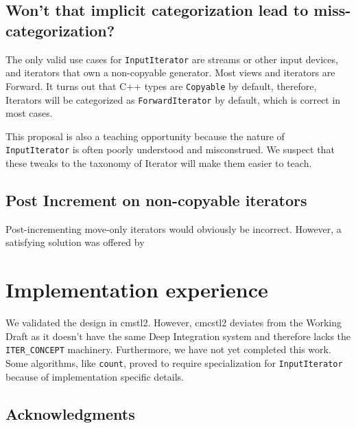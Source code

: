 \documentclass{wg21}
\begin{document}
\hypertarget{wont-that-implicit-categorization-lead-to-miss-categorization}{%
	\subsection{Won't that implicit categorization lead to
		miss-categorization?}\label{wont-that-implicit-categorization-lead-to-miss-categorization}}

The only valid use cases for \texttt{InputIterator} are streams or other
input devices, and iterators that own a non-copyable generator. Most
views and iterators are Forward. It turns out that C++ types are
\texttt{Copyable} by default, therefore, Iterators will be categorized
as \texttt{ForwardIterator} by default, which is correct in most cases.

This proposal is also a teaching opportunity because the nature of
\texttt{InputIterator} is often poorly understood and misconstrued. We
suspect that these tweaks to the taxonomy of Iterator will make them
easier to teach.

\hypertarget{post-increment-on-non-copyable-iterators}{%
	\subsection{Post Increment on non-copyable
		iterators}\label{post-increment-on-non-copyable-iterators}}

Post-incrementing move-only iterators would obviously be incorrect.
However, a satisfying solution was offered by \cite{P0541}


\hypertarget{implementation-experience}{%
	\section{Implementation experience}\label{implementation-experience}}

We validated the design in cmstl2. However, cmcstl2 deviates from the
Working Draft as it doesn't have the same Deep Integration system and
therefore lacks the \texttt{ITER\_CONCEPT} machinery. Furthermore, we
have not yet completed this work. Some algorithms, like \texttt{count},
proved to require specialization for \texttt{InputIterator} because of
implementation specific details.

\hypertarget{acknowledgments}{%
	\subsection{Acknowledgments}\label{acknowledgments}}
\end{document}
